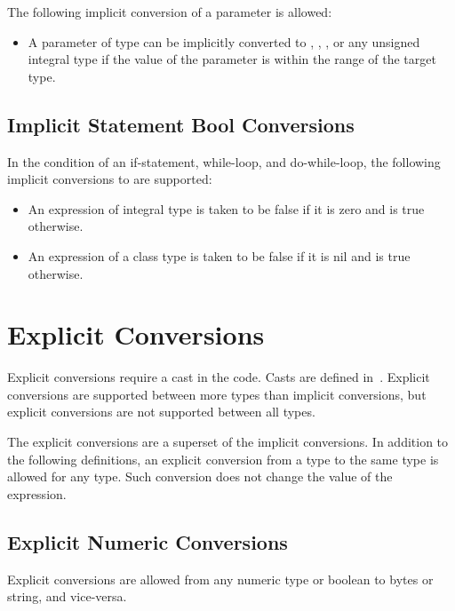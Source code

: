 The following implicit conversion of a parameter is allowed:
\begin{itemize}
\item A parameter of type  can be implicitly converted
to , , , or any unsigned integral type if the
value of the parameter is within the range of the target type.
\end{itemize}

\subsection{Implicit Statement Bool Conversions}
\label{Implicit_Statement_Bool_Conversions}

In the condition of an if-statement, while-loop, and do-while-loop,
the following implicit conversions to  are supported:
\begin{itemize}
\item An expression of integral type is taken to be false if it is zero and is true otherwise.
\item An expression of a class type is taken to be false if it is nil and is true otherwise.
\end{itemize}

\section{Explicit Conversions}
\label{Explicit_Conversions}

Explicit conversions require a cast in the code.  Casts are defined
in~.  Explicit conversions are supported between more
types than implicit conversions, but explicit conversions are not
supported between all types.

The explicit conversions are a superset of the implicit conversions.
In addition to the following definitions,
an explicit conversion from a type to the same type is allowed for any type.
Such conversion does not change the value of the expression.

\subsection{Explicit Numeric Conversions}
\label{Explicit_Numeric_Conversions}

Explicit conversions are allowed from any numeric type or boolean to bytes or
string, and vice-versa.

